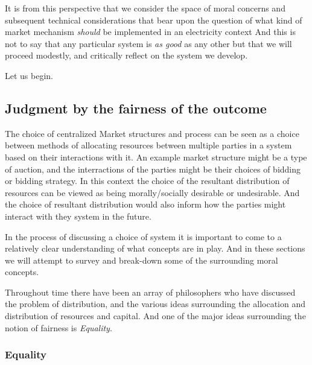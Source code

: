 \documentclass{article}
\begin{document}
It is from this perspective that we consider the space of moral concerns and subsequent technical considerations that bear upon the question of what kind of market mechanism \textit{should} be implemented in an electricity context
And this is not to say that any particular system is \textit{as good} as any other but that we will proceed modestly, and critically reflect on the system we develop.

Let us begin.

\subsection{Judgment by the fairness of the outcome}

The choice of centralized Market structures and process can be seen as a choice between methods of allocating resources between multiple parties in a system based on their interactions with it.
An example market structure might be a type of auction, and the interractions of the parties might be their choices of bidding or bidding strategy.
In this context the choice of the resultant distribution of resources can be viewed as being morally/socially desirable or undesirable. And the choice of resultant distribution would also inform how the parties might interact with they system in the future.


In the process of discussing a choice of system it is important to come to a relatively clear understanding of what concepts are in play. And in these sections we will attempt to survey and break-down some of the surrounding moral concepts.

Throughout time there have been an array of philosophers who have discussed the problem of distribution, and the various ideas surrounding the allocation and distribution of resources and capital. And one of the major ideas surrounding the notion of fairness is \textit{Equality}.

\subsubsection{Equality}
\end{document}
